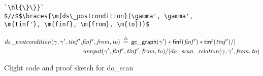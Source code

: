 \begin{figure}[t]
\begin{lstlisting}[multicols = 2]
`\hl{\}\}}`
$//$$\braces{\m{ds\_postcondition}(\gamma', \gamma', \m{tinf'}, \m{finf}, \m{from}, \m{to})}$
\end{lstlisting}
\footnotesize{
\vspace{-0.8em}
\begin{equation*}
\begin{split}
\m{ds\_postcondition}(\gamma, \ga', \m{tinf'}, &\m{finf'}, \m{from}, \m{to}) \; \defeq \; 
   \p{gc{\_}graph}(\ga') * \p{\finf}(\m{\finf'}) * \p{\tinf}(\m{\tinf'}) /| \null \\
   &\m{compat}(\ga', \m{\finf'}, \m{\tinf'}, \m{from}, \m{to}) /|
   \m{do\_scan\_relation}(\ga, \ga', \m{from}, \m{to})
\end{split}
\end{equation*}

}
\vspace{-0.4em}
\caption{Clight code and proof sketch for do\_scan}
\label{fig:doscan}
\vspace{-1em}
\end{figure}

\renewcommand{\tx}[1]{\text{#1}}
